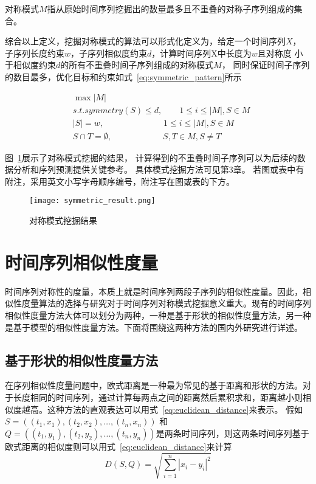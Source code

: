 \begin{definition}
  对称模式$M$指从原始时间序列挖掘出的数量最多且不重叠的对称子序列组成的集合。 
\end{definition}

综合以上定义，挖掘对称模式的算法可以形式化定义为，给定一个时间序列$X$，
子序列长度约束$w$，子序列相似度约束$d$，计算时间序列X中长度为$w$且对称度
小于相似度约束$d$的所有不重叠时间子序列组成的对称模式$M$，
同时保证时间子序列的数目最多，优化目标和约束如式~\ref{eq:symmetric_pattern}所示

\begin{equation}
  \begin{split}
    & \max \left| M \right| \\
    & s.t. symmetry \left( S \right) \leq d, \qquad 1 \leq i \leq \left| M \right|,S \in M \\
    & \left| S \right| = w, \qquad \qquad \qquad \quad 1 \leq i \leq \left| M \right|,S \in M \\
    & S \cap T = \emptyset, \qquad \qquad \qquad S,T \in M,S \neq T
  \end{split}
  \label{eq:symmetric_pattern}
\end{equation}

图~\ref{fig:symmetric_result}展示了对称模式挖掘的结果，
计算得到的不重叠时间子序列可以为后续的数据分析和序列预测提供关键参考。
具体模式挖掘方法可见第3章。
若图或表中有附注，采用英文小写字母顺序编号，附注写在图或表的下方。
\begin{figure}
  \centering
  \texttt{[image: symmetric\_result.png]}
  \caption{对称模式挖掘结果}
  \label{fig:symmetric_result}
\end{figure}

\section{时间序列相似性度量}
时间序列对称性的度量，本质上就是时间序列两段子序列的相似性度量。因此，相似性度量算法的选择与研究对于时间序列对称模式挖掘意义重大。现有的时间序列相似性度量方法大体可以划分为两种，一种是基于形状的相似性度量方法，另一种是基于模型的相似性度量方法。下面将围绕这两种方法的国内外研究进行详述。

\subsection{基于形状的相似性度量方法}
在序列相似性度量问题中，欧式距离是一种最为常见的基于距离和形状的方法。对于长度相同的时间序列，通过计算每两点之间的距离然后累积求和，距离越小则相似度越高。这种方法的直观表达可以用式~\ref{eq:euclidean_distance}来表示。
假如$S=\left(\left(t_1,x_1 \right),\left(t_2,x_2\right),\dots,\left(t_n,x_n\right)\right)$
和$Q=\left(\left(t_1,y_1 \right),\left(t_2,y_2\right),\dots,\left(t_n,y_n\right)\right)$是两条时间序列，则这两条时间序列基于欧式距离的相似度则可以用式~\ref{eq:euclidean_distance}来计算
\begin{equation}
  D\left(S,Q\right) = \sqrt{\sum_{i=1}^{n}{\left| x_{i}-y_{i} \right|^{2}}}
  \label{eq:euclidean_distance}
\end{equation}

